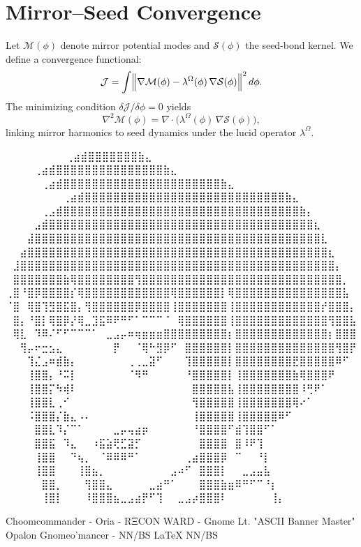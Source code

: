 
\section*{Mirror–Seed Convergence}

Let $\mathcal{M}(\phi)$ denote mirror potential modes and $\mathcal{S}(\phi)$ the seed-bond kernel.  
We define a convergence functional:
\[
\mathcal{J}=\int \Bigl\|\nabla\mathcal{M}(\phi)-\lambda^\Omega(\phi)\,\nabla\mathcal{S}(\phi)\Bigr\|^2\,d\phi.
\]
The minimizing condition $\delta\mathcal{J}/\delta\phi=0$ yields
\[
\nabla^2\mathcal{M}(\phi)=\nabla\!\cdot\!\bigl(\lambda^\Omega(\phi)\,\nabla\mathcal{S}(\phi)\bigr),
\]
linking mirror harmonics to seed dynamics under the lucid operator $\lambda^\Omega$.

\iffalse
⠀⠀⠀⠀⠀⠀             ⠀⠀⢀⣴⣾⣿⣿⣿⣿⣿⣿⣿⣷⣄⠀⠀⠀⠀⠀⠀⠀⠀
⠀⠀⠀  ⠀      ⠀⠀⠀⠀⢀⣴⣾⣿⣿⣿⣿⣿⣿⣿⣿⣿⣿⣿⣿⣿⣿⣿⣷⣄⠀⠀⠀⠀⠀⠀⠀⠀
⠀⠀ ⠀   ⠀⠀⠀⠀⠀⢀⣴⣾⣿⣿⣿⣿⣿⣿⣿⣿⣿⣿⣿⣿⣿⣿⣿⣿⣿⣿⣿⣿⣿⣿⣷⣄⠀⠀⠀⠀⠀⠀⠀⠀
⠀⠀⠀⠀⠀⠀⠀⠀⢀⣴⣾⣿⣿⣿⣿⣿⣿⣿⣿⣿⣿⣿⣿⣿⣿⣿⣿⣿⣿⣿⣿⣿⣿⣿⣿⣿⣿⣿⣿⣷⣄⠀⠀⠀⠀⠀⠀⠀⠀
⠀⠀⠀⠀⠀⢀⣠⣾⣿⣿⣿⣿⣿⣿⣿⣿⣿⣿⣿⣿⣿⣿⣿⣿⣿⣿⣿⣿⣿⣿⣿⣿⣿⣿⣿⣿⣿⣿⣿⣿⣿⣷⡄⠀⠀⠀⠀⠀⠀
⠀⠀⠀⠀⣠⣾⣿⣿⣿⣿⣿⣿⣿⣿⣿⣿⣿⣿⣿⣿⣿⣿⣿⣿⣿⣿⣿⣿⣿⣿⣿⣿⣿⣿⣿⣿⣿⣿⣿⣿⣿⣿⣿⣆⠀⠀⠀⠀⠀
⠀⠀⠀⣼⣿⣿⣿⣿⣿⣿⣿⣿⣿⣿⣿⣿⣿⣿⣿⣿⣿⣿⣿⣿⣿⣿⣿⣿⣿⣿⣿⣿⣿⣿⣿⣿⣿⣿⣿⣿⣿⣿⣿⣿⣇⠀⠀⠀⠀
⠀⠀⣴⣿⣿⣿⣿⣿⣿⣿⣿⣿⣿⣿⣿⣿⣿⣿⣿⣿⣿⣿⣿⣿⣿⣿⣿⣿⣿⣿⣿⣿⣿⣿⣿⣿⣿⣿⣿⣿⣿⣿⣿⣿⣿⣆⠀⠀⠀
⠀⣸⣿⣿⣿⣿⣿⣿⣿⣿⣿⣿⣿⣿⣿⣿⣿⣿⣿⣿⣿⣿⣿⣿⣿⣿⣿⣿⣿⣿⣿⣿⣿⣿⣿⣿⣿⣿⣿⣿⣿⣿⣿⣿⣿⣿⡄⠀⠀
⠀⣿⣿⣿⣿⣿⣿⣿⣷⢿⣿⣿⣿⣿⣿⣿⣿⣿⢻⣿⣿⣿⣿⣿⣿⣿⣿⣿⣿⣿⣿⣿⣿⣿⣿⣿⣿⣿⣿⣿⣿⣿⣿⣿⣿⣿⣿⡀⠀
⢀⣿⠘⣿⡿⣿⣿⣿⣿⡎⢿⣿⣿⣿⣿⣿⣿⣿⣿⣿⣿⣿⣿⢿⣿⣿⣿⣿⣿⣿⡇⢿⣿⣿⣿⣿⣿⣿⣿⣿⣿⣿⣿⣿⣿⣿⣿⣧⠀
⠈⣿⠀⢿⣿⢹⣻⣿⣯⣿⡄⢻⣿⣿⣿⣿⣿⣿⡿⣿⣿⣿⣿⢸⣿⣿⣿⣿⣿⣿⣿⢸⣿⣿⣿⣿⣿⣿⣿⣿⣿⣿⣿⣿⡞⣿⣿⣿⡄
⠀⣿⡄⠘⣿⡇⢿⣿⡿⡜⢿⣀⣹⣯⠿⠟⠛⠋⠁⠉⠉⠉⠈⠀⢿⣿⣿⣿⣿⣿⣿⢸⣿⣿⣿⣿⣿⣿⣿⣿⣿⣿⣿⣿⣿⢻⣿⣿⣧
⠀⢿⣇⠀⠹⠿⠌⠋⠋⠉⠉⠉⠁⠀⣀⣠⡤⠶⢶⣶⣶⣶⣿⣿⣿⣿⣿⣿⣿⣿⣿⡆⣿⣿⣿⣿⣿⣿⣿⣿⣿⣿⣿⣿⣿⡆⣿⣿⣿
⠀⠀⢻⡤⠖⣒⣢⣄⠀⠀⠀⠀⠀⠀⠀⡟⠀⠀⠈⢿⠓⣻⡿⠋⠀⣿⣿⣿⣿⣿⣿⡇⣿⣿⣿⣿⣿⣿⣿⣿⣿⣿⣿⣿⣿⣿⢻⣿⡟
⠀⠀⠀⢹⣌⣠⠶⣾⣷⡄⠀⠀⠀⠀⠀⠀⠀⢀⢀⣀⣽⠋⠀⠀⠀⢹⣿⣿⣿⣿⣿⡇⣿⣿⣿⣿⣿⣿⣿⣿⣟⣿⣿⣿⣿⣿⠿⠋⠀
⠀⠀⠀⢸⣿⣿⡄⠘⠭⡇⠀⠀⠀⠀⠀⠀⠀⠈⠻⠛⠀⠀⠀⠀⠀⠘⣿⣿⣿⣿⣿⡇⢸⣿⣿⣿⣿⣿⣿⣿⣷⢿⣿⣿⣿⠟⠀⠀⠀
⠀⠀⠀⢸⣿⣿⡍⠳⢾⠇⠀⠀⠀⠀⠀⠀⠀⠀⠀⠀⠀⠀⠀⠀⠀⠀⣿⣿⣿⣿⣿⣧⢸⣿⣿⣿⣿⣿⣿⣿⣿⠸⢛⠟⠁⠀⠀⠀⠀
⠀⠀⠀⢸⣿⣿⣇⢀⠊⠀⠀⠀⠀⠀⠀⠀⠀⠀⠀⠀⠀⠀⠀⠀⠀⠀⢻⣿⣿⣿⣿⣿⢸⣿⣿⣿⣿⣿⣿⣿⢿⠔⠁⠀⠀⠀⠀⠀⠀
⠀⠀⠀⠨⣿⣿⣿⡌⣷⣄⠠⠄⠀⠀⠀⠀⠀⠀⠀⠀⠀⠀⠀⠀⠀⠀⢸⣿⣿⣿⣿⣿⢸⣿⣿⣿⣿⣿⠿⠋⠀⠀⠀⠀⠀⠀⠀⠀⠀
⠀⠀⠀⠀⣿⣿⣇⠹⡌⠉⠁⠀⠀⠀⠀⣀⡤⢤⣴⡶⠀⠀⠀⠀⠀⠀⠘⣿⣿⣿⣿⠋⣾⢹⣿⣿⠋⠁⠀⠀⠀⠀⠀⠀⠀⠀⠀⠀⠀
⠀⠀⠀⠀⣿⣿⣯⠀⠹⣄⠀⠀⠰⣯⣵⢟⣋⣽⡋⠀⠀⠀⠀⠀⠀⠀⠀⣿⣿⣿⣿⠀⣿⠸⠟⢹⠀⠀⠀⠀⠀⠀⠀⠀⠀⠀⠀⠀⠀
⠀⠀⠀⠀⢸⣿⣿⠀⠀⠙⢦⡀⠀⠈⠿⠿⠿⠛⠁⠀⠀⠀⠀⠀⠀⢀⣴⣿⣿⣿⡿⠀⠉⠀⠀⠘⡇⠀⠀⠀⠀⠀⠀⠀⠀⠀⠀⠀⠀
⠀⠀⠀⠀⢸⣿⣿⠀⠀⠀⢸⣿⣦⡀⠀⠀⠀⠀⠀⠀⠀⠀⠀⣠⠴⠋⠀⣿⣿⣿⡇⠀⠀⣀⣠⣤⣧⠀⠀⠀⠀⠀⠀⠀⠀⠀⠀⠀⠀
⠀⠀⠀⠀⠀⣿⣿⡀⠀⠀⠀⢻⣿⣿⣄⠀⠀⠀⠀⠀⣀⣴⠛⠁⠀⠀⠀⣿⣿⣿⣷⣶⠿⠛⠋⠉⠘⡆⠀⠀⠀⠀⠀⠀⠀⠀⠀⠀⠀
⠀⠀⠀⠀⠀⢸⣿⡇⠀⠀⠀⠸⣿⣿⣿⣦⣀⣠⣴⡟⠋⢹⠀⠀⣀⣠⡴⣿⣿⣿⠇⠀⠀⠀⠀⠀⠀⢸⡄⠀⠀⠀⠀⠀⠀⠀⠀⠀⠀

Choomcommander - Oria - RΞCON WARD - Gnome Lt. "ASCII Banner Master"
             Opalon Gnomeo'mancer - NN/BS LaTeX{} NN/BS


